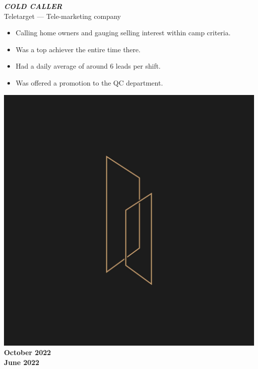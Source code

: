 \documentclass[10pt]{article}
\newcommand{\fancy}[1]{\Large\textbf{\textit{#1}}}
\begin{document}
\vspace{3em}

\noindent
\begin{minipage}{0.7\textwidth}
 \fancy{COLD CALLER} \\
{\large Teletarget --- Tele-marketing company} \\
\begin{itemize}
    \item Calling home owners and gauging selling interest within camp criteria.
    \item Was a top achiever the entire time there.
    \item Had a daily average of around 6 leads per shift.
    \item Was offered a promotion to the QC department.
\end{itemize}   
\end{minipage}
\hspace{35pt}
\begin{minipage}{0.2\textwidth}
\begin{center}
\includegraphics[width=\textwidth]{tt_coldcalling.jpg} \\
    \large\textbf{October 2022\\June 2022}
\end{center}
\end{minipage}
\end{document}
